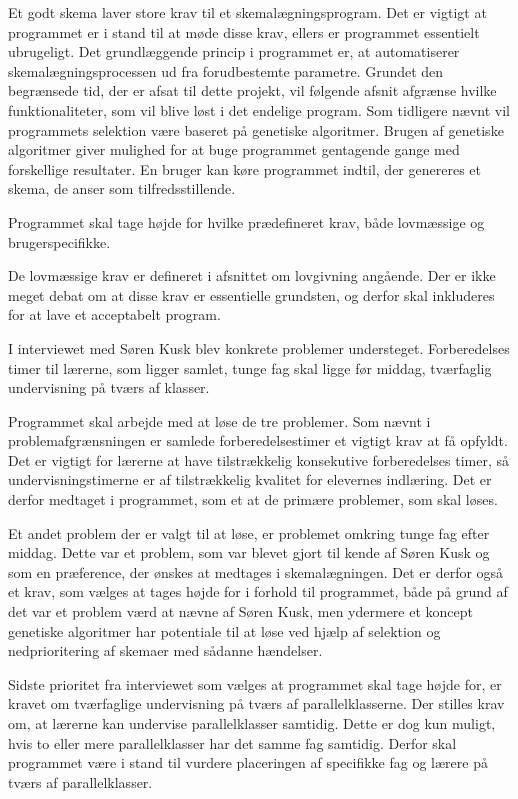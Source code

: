 Et godt skema laver store krav til et skemalægningsprogram. Det er vigtigt at programmet er i stand til at møde disse krav, ellers er programmet essentielt ubrugeligt. Det grundlæggende princip i programmet er, at automatiserer skemalægningsprocessen ud fra forudbestemte parametre. Grundet den begrænsede tid, der er afsat til dette projekt, vil følgende afsnit afgrænse hvilke funktionaliteter, som vil blive løst i det endelige program.
Som tidligere nævnt vil programmets selektion være baseret på genetiske algoritmer. Brugen af genetiske algoritmer giver mulighed for at buge programmet gentagende gange med forskellige resultater. En bruger kan køre programmet indtil, der genereres et skema, de anser som tilfredsstillende.

Programmet skal tage højde for hvilke prædefineret krav, både lovmæssige og brugerspecifikke.

De lovmæssige krav er defineret i afsnittet om lovgivning angående. Der er ikke meget debat om at disse krav er essentielle grundsten, og derfor skal inkluderes for at lave et acceptabelt program. 

I interviewet med Søren Kusk blev konkrete problemer understeget. Forberedelses timer til lærerne, som ligger samlet, tunge fag skal ligge før middag, tværfaglig undervisning på tværs af klasser.\cite{interview}

Programmet skal arbejde med at løse de tre problemer. Som nævnt i problemafgrænsningen er samlede forberedelsestimer et vigtigt krav at få opfyldt. Det er vigtigt for lærerne at have tilstrækkelig konsekutive forberedelses timer, så undervisningstimerne er af tilstrækkelig kvalitet for elevernes indlæring. Det er derfor medtaget i programmet, som et at de primære problemer, som skal løses. 

Et andet problem der er valgt til at løse, er problemet omkring tunge fag efter middag. Dette var et problem, som var blevet gjort til kende af Søren Kusk og som en præference, der ønskes at medtages i skemalægningen.\cite{interview} Det er derfor også et krav, som vælges at tages højde for i forhold til programmet, både på grund af det var et problem værd at nævne af Søren Kusk, men ydermere et koncept genetiske algoritmer har potentiale til at løse ved hjælp af selektion og nedprioritering af skemaer med sådanne hændelser.

Sidste prioritet fra interviewet som vælges at programmet skal tage højde for, er kravet om tværfaglige undervisning på tværs af parallelklasserne. Der stilles krav om, at lærerne kan undervise parallelklasser samtidig. Dette er dog kun muligt, hvis to eller mere parallelklasser har det samme fag samtidig. Derfor skal programmet være i stand til vurdere placeringen af specifikke fag og lærere på tværs af parallelklasser. 

